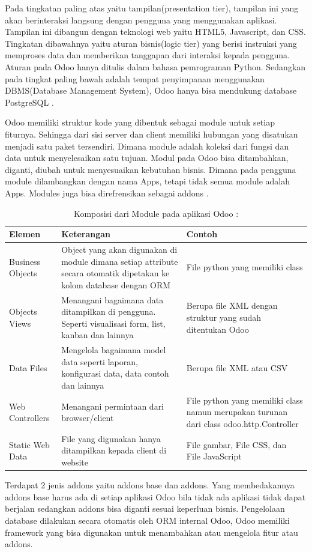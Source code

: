 Pada tingkatan paling atas yaitu tampilan(presentation tier), tampilan ini yang akan berinteraksi langsung dengan pengguna yang menggunakan aplikasi. Tampilan ini dibangun dengan teknologi web yaitu HTML5, Javascript, dan CSS. Tingkatan dibawahnya yaitu aturan bisnis(logic tier) yang berisi instruksi yang memproses data dan memberikan tanggapan dari interaksi kepada pengguna. Aturan pada Odoo hanya ditulis dalam bahasa pemrograman Python. Sedangkan pada tingkat paling bawah adalah tempat penyimpanan menggunakan DBMS(Database Management System), Odoo hanya bisa mendukung database PostgreSQL \cite{odoo}.

Odoo memiliki struktur kode yang dibentuk sebagai module untuk setiap fiturnya. Sehingga dari sisi server dan client memiliki hubungan yang disatukan menjadi satu paket tersendiri. Dimana module adalah koleksi dari fungsi dan data untuk menyelesaikan satu tujuan. Modul pada Odoo bisa ditambahkan, diganti, diubah untuk menyesuaikan kebutuhan bisnis. Dimana pada pengguna module dilambangkan dengan nama Apps, tetapi tidak semua module adalah Apps. Modules juga bisa direfrensikan sebagai addons \cite{odoo}.

\begingroup
\setlength{\LTleft}{-20cm plus -1fill}
\setlength{\LTright}{\LTleft}
\begin{small}
	\begin{longtable}{|p{2.5cm}|p{6cm}|p{4.5cm}|}
		\caption{Komposisi dari Module pada aplikasi Odoo \cite{odoo}:}\\
		\hline
		\textbf{Elemen} & \textbf{Keterangan} & \textbf{Contoh}\\
		\endfirsthead
		
		\hline
		    Business Objects
		  & Object yang akan digunakan di module dimana setiap attribute secara otomatik dipetakan ke kolom database dengan ORM
		  & File python yang memiliki class\\
		\hline  
		Objects Views
		  & Menangani bagaimana data ditampilkan di pengguna. Seperti visualisasi form, list, kanban dan lainnya
		  & Berupa file XML dengan struktur yang sudah ditentukan Odoo\\
		\hline
		Data Files
		  & Mengelola bagaimana model data seperti laporan, konfigurasi data, data contoh dan lainnya
		  & Berupa file XML atau CSV\\
		\hline
		Web Controllers
		  & Menangani permintaan dari browser/client
		  & File python yang memiliki class namun merupakan turunan dari class odoo.http.Controller\\
		\hline
		  Static Web Data
		  & File yang digunakan hanya ditampilkan kepada client di website
		  & File gambar, File CSS, dan File JavaScript\\
		 \hline  
	\end{longtable}
\end{small}
\endgroup
Terdapat 2 jenis addons yaitu addons base dan addons. Yang membedakannya addons base harus ada di setiap aplikasi Odoo bila tidak ada aplikasi tidak dapat berjalan sedangkan addons bisa diganti sesuai keperluan bisnis. Pengelolaan database dilakukan secara otomatis oleh ORM internal Odoo, Odoo memiliki framework yang bisa digunakan untuk menambahkan atau mengelola fitur atau addons. 


